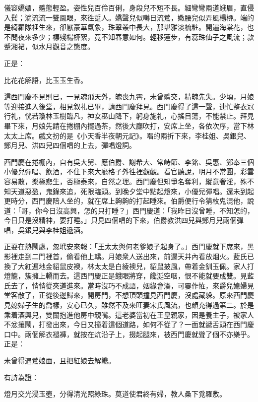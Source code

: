 儀容嬌媚，體態輕盈。姿性兒百伶百俐，身段兒不短不長。細彎彎兩道蛾眉，直侵入鬂；滴流流一雙鳳眼，來徃踅人。嬌聲兒似囀日流鶯，嫩腰兒似弄風楊桺。端的是綺羅隊裡生來，卻厭豪華氣象，珠翠叢中長大，那堪雅淡梳粧。開遍海棠花，也不問夜來多少；標殘楊桺絮，竟不知春意如何。輕移蓮步，有蕊珠仙子之風流；款蹙湘裙，似水月觀音之態度。{}

正是：

比花花解語，比玉玉生香。

這西門慶不見則已，一見魂飛天外，魄䘮九霄，未曾體交，精魄先失。少頃，月娘等迎接進入後堂，相見叙礼已畢，請西門慶拜見。西門慶得了這一聲，連忙整衣冠行礼，恍若瓊林玉樹臨凡，神女巫山降下，躬身施礼，心搖目蕩，不能禁止。{}拜見畢下來，月娘先請在捲棚內擺過茶，然後大廳吹打，安席上坐，各依次序，當下林太太上席。戲文扮的是《小天香半夜朝元記》。唱的兩折下來，李桂姐、吳銀兒、鄭月兒、洪四兒四個唱的上去，彈唱燈詞。

西門慶在捲棚內，自有吳大舅、應伯爵、謝希大、常峙節、李銘、吳惠、鄭奉三個小優兒彈唱、飲酒，不住下來大廳格子外徃裡觀覷。看官聽說，明月不常圓，彩雲容易散，樂極悲生，否極泰來，自然之理。西門慶但知爭名奪利，縱意奢淫，殊不知天道惡盈，鬼錄來追，死限臨頭。{}到晚夕堂中點起燈來，小優兒彈唱。還未到起更時分，西門慶陪人坐的，就在席上齁齁的打起睡來。伯爵便行令猜枚鬼混他，說道：「哥，你今日沒高興，怎的只打睡？」西門慶道：「我昨日沒曾睡，不知怎的，今日只是沒精神，要打睡。」只見四個唱的下來，伯爵教洪四兒與鄭月兒兩個彈唱，吳銀兒與李桂姐遞酒。

正耍在熱鬧處，忽玳安來報：「王太太與何老爹娘子起身了。」{}西門慶就下席來，黑影裡走到二門裡首，偷看他上轎。月娘衆人送出來，前邊天井內看放烟火。藍氏已換了大紅遍地金貂鼠皮襖，林太太是白綾襖兒，貂鼠披風，帶着金釧玉佩。家人打燈籠，簇擁上轎而去。這西門慶正是餓眼將穿，饞涎空咽，恨不能就要成雙。見藍氏去了，悄悄從夾道進來。當時沒巧不成語，姻緣會湊，可霎作恠，來爵兒媳婦見堂客散了，正從後邊歸來，開房門，不想頂頭撞見西門慶，沒處藏躲。原來西門慶見媳婦子生的喬樣，安心已久，雖然不及來旺妻宋氏風流，也頗充得過第二。於是乘着酒興兒，雙關抱進他房中親嘴。這老婆當初在王皇親家，因是養主子，被家人不忿攘鬧，打發出來，今日又撞着這個道路，如何不從了？{}一面就遞舌頭在西門慶口中。兩個解衣褪褲，就按在炕沿子上，掇起腿來，被西門慶就聳了個不亦樂乎。{}正是：

未曾得遇鶯娘面，且把紅娘去解饞。

有詩為證：

燈月交光浸玉壺，分得清光照綠珠。莫道使君終有婦，教人桑下覓羅敷。

